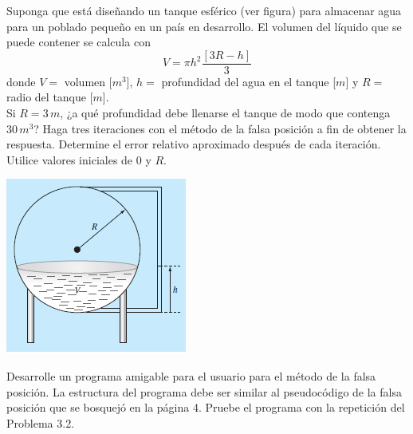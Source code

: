 \documentclass[12pt,letterpaper]{article}
\theoremstyle{definition}
\theoremstyle{plain}
\theoremstyle{remark}
\begin{document}
\begin{multicols}{2}
{\problem Suponga que está diseñando un tanque esférico (ver figura) para almacenar agua para un poblado pequeño en un país en desarrollo. El volumen del líquido que se puede contener se calcula con $$V=\pi h^2\frac{[3R-h]}{3}$$ donde $V=$ volumen [$m^3$], $h=$ profundidad del agua en el tanque [$m$] y $R=$ radio del tanque [$m$].\\
Si $R=3\,m$, ¿a qué profundidad debe llenarse el tanque de modo que contenga $30\,m^3$? Haga tres iteraciones con el método de la falsa posición a fin de obtener la respuesta. Determine el error relativo aproximado después de cada iteración. Utilice valores iniciales de $0$ y $R$.\begin{center}
\includegraphics[scale=1]{images/Clase2-p4.png}
\end{center}}

{\problem Desarrolle un programa amigable para el usuario para el método de la falsa posición. La estructura del programa debe ser similar al pseudocódigo de la falsa posición que se bosquejó en la página 4. Pruebe el programa con la repetición del Problema 3.2.}
\end{multicols}
\end{document}

